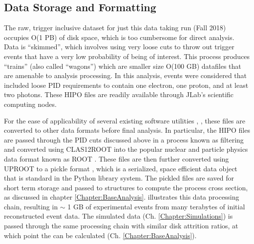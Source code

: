 \subsection{Data Storage and Formatting}\label{sec:filtering}
    The raw, trigger inclusive dataset for just this data taking run (Fall 2018) occupies O(1 PB) of disk space, which is too cumbersome for direct analysis. Data is ``skimmed'', which involves using very loose cuts to throw out trigger events that have a very low probability of being of interest. This process produces ``trains'' (also called ``wagons'') which are smaller size O(100 GB) datafiles that are amenable to analysis processing. In this analysis, events were considered that included loose PID requirements to contain one electron, one proton, and at least two photons.  These HIPO files are readily available through JLab's scientific computing nodes. 

    
    For the ease of applicability of several existing software utilities \parencite{Virtanen2020SciPyPython}, \parencite{Harris2020ArrayNumPy}, these files are converted to other data formats before final analysis. In particular, the HIPO files are passed through the PID cuts discussed above in a process known as filtering \parencite{Lee2023FilterEvents} and converted using CLAS12ROOT \parencite{Glazier2023Clas12root} into the popular nuclear and particle physics data format known as ROOT \parencite{Brun1997ROOTFramework}. These files are then further converted using UPROOT \parencite{Pivarski2022Scikit-hep/uproot4:4.2.1} to a pickle format \parencite{Python2023PickleSerialization}, which is a serialized, space efficient data object that is standard in the Python library system. The pickled files are saved for short term storage and passed to structures to compute the process cross section, as discussed in chapter \ref{Chapter:BaseAnalysis}.  illustrates this data processing chain, resulting in $\sim$ 1 GB of experimental events from many terabytes of initial reconstructed event data. The simulated data (Ch. \ref{Chapter:Simulations}) is passed through the same processing chain with similar disk attrition ratios, at which point the \xsec can be calculated (Ch. \ref{Chapter:BaseAnalysis}). 

